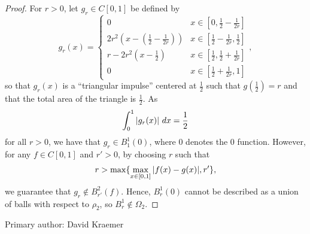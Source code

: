\begin{proof}
    For $r > 0$, let $g_r \in C[0,1]$ be defined by
    \[
        g_r(x) =
        \begin{cases}
            0 & x \in [0, \tfrac{1}{2} - \tfrac{1}{2r}] \\
            2r^2(x - (\tfrac{1}{2} - \tfrac{1}{2r})) & x \in [\tfrac{1}{2} - \tfrac{1}{2r}, \tfrac{1}{2}] \\
            r - 2r^2(x - \tfrac{1}{2}) & x \in [\tfrac{1}{2},\tfrac{1}{2} + \tfrac{1}{2r}] \\
            0 & x \in [\tfrac{1}{2} + \tfrac{1}{2r}, 1]
        \end{cases},
    \]
    so that $g_r(x)$ is a ``triangular impulse'' centered at $\frac{1}{2}$ such
    that $g(\frac{1}{2}) = r$ and that the total area of the triangle is
    $\frac{1}{2}$.
    As
    \[
        \int_{0}^{1} |g_r(x)| \ dx = \frac{1}{2}
    \]
    for all $r > 0$, we have that $g_r \in B_1^1(0)$, where 0 denotes the 0
    function. However, for any $f \in C[0,1]$ and $r' > 0$, by choosing $r$ such
    that
    \[
        r > \max\{\max_{x \in [0,1]} |f(x) - g(x)|, r'\},
    \]
    we guarantee that $g_r \notin B_{r'}^2(f)$. Hence, $B_r^1(0)$ cannot be
    described as a union of balls with respect to $\rho_2$, so $B_r^1 \notin
    \Omega_2$.
\end{proof}

Primary author: David Kraemer
